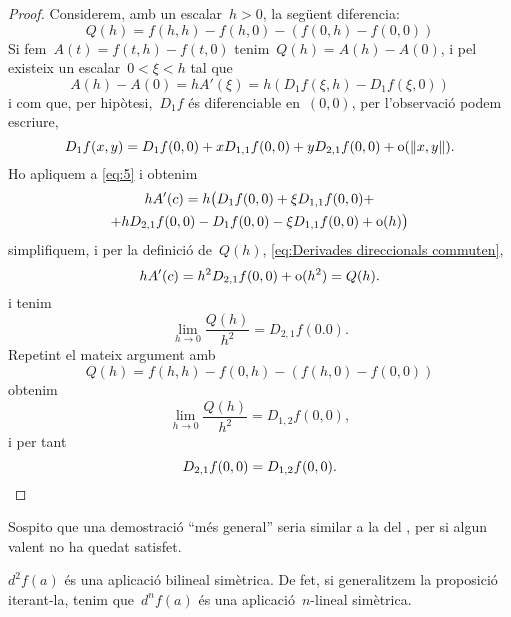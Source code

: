 \documentclass[../../main.tex]{subfiles}
\begin{document}
\begin{theorem}
\begin{note}
\begin{proof}
        Considerem, amb un escalar~\(h>0\), la següent diferencia:
        \begin{equation}\label{eq:Derivades direccionals commuten}
        Q(h)=f(h,h)-f(h,0)-(f(0,h)-f(0,0))
        \end{equation}
        Si fem~\(A(t)=f(t,h)-f(t,0)\) tenim~\(Q(h)=A(h)-A(0)\), i pel  existeix un escalar~\(0<\xi<h\) tal que
        \begin{equation}\label{eq:5}
        A(h)-A(0)=hA'(\xi)=h(D_{1}f(\xi,h)-D_{1}f(\xi,0))
        \end{equation}
        i com que, per hipòtesi,~\(D_{1}f\) és diferenciable en~\((0,0)\), per l'observació  podem escriure,
        \[
            D_{1}f(x,y)=D_{1}f(0,0)+xD_{1,1}f(0,0)+yD_{2,1}f(0,0)+\omicron(\norm{x,y}).
        \]
        Ho apliquem a \eqref{eq:5} i obtenim
        \begin{multline*}
        hA'(c)=h\big(D_{1}f(0,0)+\xi D_{1,1}f(0,0)+\\+hD_{2,1}f(0,0)-D_{1}f(0,0)-\xi D_{1,1}f(0,0)+\operatorname{o}(h)\big)
        \end{multline*}
        simplifiquem, i per la definició de~\(Q(h)\), \eqref{eq:Derivades direccionals commuten},
        \[
            hA'(c)=h^{2}D_{2,1}f(0,0)+\operatorname{o}(h^{2})=Q(h).
        \]
        i tenim
        \[
            \lim_{h\to0}\frac{Q(h)}{h^{2}}=D_{2,1}f(0.0).
        \]
        Repetint el mateix argument amb
        \[
            Q(h)=f(h,h)-f(0,h)-(f(h,0)-f(0,0))
        \]
        obtenim
        \[
            \lim_{h\to0}\frac{Q(h)}{h^{2}}=D_{1,2}f(0,0),
        \]
        i per tant
        \[
            D_{2,1}f(0,0)=D_{1,2}f(0,0).\qedhere
        \]
    \end{proof}
            Sospito que una demostració ``més general'' seria similar a la del , per si algun valent no ha quedat satisfet.
        \end{note}
    \end{theorem}
    \begin{corollary}\label{obs:diferencial bilineal}
        \(d^{2}f(a)\) és una aplicació bilineal simètrica.
        De fet, si generalitzem la proposició iterant-la, tenim que~\(d^{n}f(a)\) és una aplicació~\(n\)-lineal simètrica.
    \end{corollary}
\end{document}
